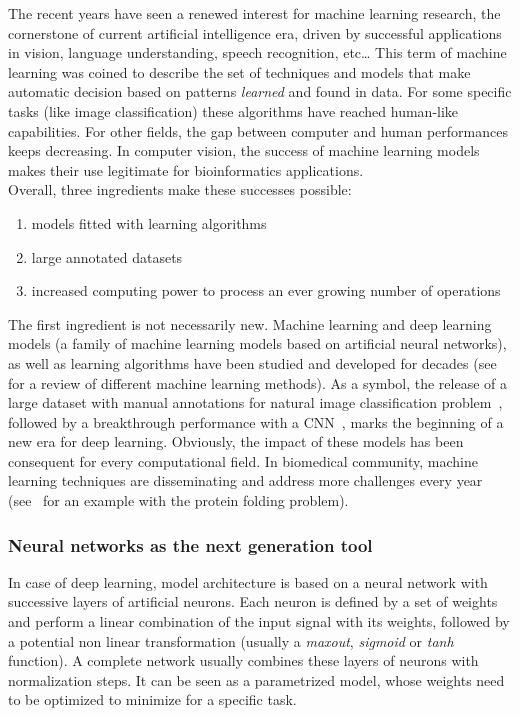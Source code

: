 The recent years have seen a renewed interest for machine learning research, the cornerstone of current artificial intelligence era, driven by successful applications in vision, language understanding, speech recognition, etc\dots
This term of machine learning was coined to describe the set of techniques and models that make automatic decision based on patterns \emph{learned} and found in data.
For some specific tasks (like image classification) these algorithms have reached human-like capabilities.
For other fields, the gap between computer and human performances keeps decreasing.
In computer vision, the success of machine learning models makes their use legitimate for bioinformatics applications.\\

\noindent
Overall, three ingredients make these successes possible:
\begin{enumerate}
	\setlength\itemsep{0.1em}
	\item models fitted with learning algorithms
	\item large annotated datasets
	\item increased computing power to process an ever growing number of operations
\end{enumerate}

\noindent
The first ingredient is not necessarily new.
Machine learning and deep learning models (a family of machine learning models based on artificial neural networks), as well as learning algorithms have been studied and developed for decades (see~\cite{Bishop_2006, hastie_elements_2009} for a review of different machine learning methods).
As a symbol, the release of a large dataset with manual annotations for natural image classification problem~\cite{Deng_2009}, followed by a breakthrough performance with a \ac{CNN}~\cite{alexnet_2012}, marks the beginning of a new era for deep learning.
Obviously, the impact of these models has been consequent for every computational field.
In biomedical community, machine learning techniques are disseminating and address more challenges every year (see~\cite{jumper_highly_2021} for an example with the protein folding problem).

\subsubsection{Neural networks as the next generation tool}

In case of deep learning, model architecture is based on a neural network with successive layers of artificial neurons.
Each neuron is defined by a set of weights and perform a linear combination of the input signal with its weights, followed by a potential non linear transformation (usually a \emph{maxout}, \emph{sigmoid} or \emph{tanh} function).
A complete network usually combines these layers of neurons with normalization steps.
It can be seen as a parametrized model, whose weights need to be optimized to minimize for a specific task.

